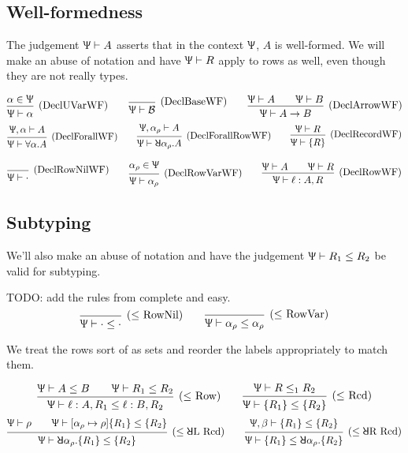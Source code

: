 \documentclass{article}
\newcommand{\declCtx}{\Uppsi}
\newcommand{\rcd}[1]{\{#1\}}
\newcommand{\B}{\mathcal{B}}
\newcommand{\rowall}{\rotatebox[origin=c]{180}{\(\mathsf{R}\)}}
\newcommand{\rowvar}{\alpha_\rho}
\newcommand{\spc}{\qquad}
\newcommand{\wf}[2]{#1 \vdash #2}
\newcommand{\subtype}{\le}
\newcommand{\subtypes}[3]{#1 \vdash #2 \le #3}
\newcommand{\deduct}[3][]
{
  \begin{prooftree}
    \hypo{#2}
    \infer1[\text{#1}]{#3}
  \end{prooftree}
}
\begin{document}
\subsection{Well-formedness}

The judgement \(\wf \declCtx A\) asserts that in the context \(\declCtx\), \(A\) is
well-formed. We will make an abuse of notation and have \(\wf \declCtx R\) apply to
rows as well, even though they are not really types.

\[
  \deduct[(DeclUVarWF)]
  {\alpha \in \declCtx}
  {\wf{\declCtx}{\alpha}}
  \spc
  \deduct[(DeclBaseWF)]
  {}
  {\wf{\declCtx}{\B}}
  \spc
  \deduct[(DeclArrowWF)]
  {\wf \declCtx A \spc \wf \declCtx B}
  {\wf \declCtx {A \to B}}
\]
\[
  \deduct[(DeclForallWF)]
  {\wf{\declCtx, \alpha}{A}}
  {\wf \declCtx {\forall \alpha. A}}
  \spc
  \deduct[(DeclForallRowWF)]
  {\wf{\declCtx, \rowvar}{A}}
  {\wf \declCtx {\rowall \rowvar. A}}
  \spc
  \deduct[(DeclRecordWF)]
  {\wf \declCtx R}
  {\wf \declCtx {\rcd{R}}}
\]

\[
  \deduct[(DeclRowNilWF)]
  {}
  {\wf \declCtx \cdot}
  \spc
  \deduct[(DeclRowVarWF)]
  {\rowvar \in \declCtx}
  {\wf \declCtx \rowvar}
  \spc
  \deduct[(DeclRowWF)]
  {\wf \declCtx A \spc \wf \declCtx R}
  {\wf \declCtx {\ell : A, R}}
\]


\subsection{Subtyping}
We'll also make an abuse of notation and have the judgement \(\subtypes{\declCtx}{R_1}{R_2}\) be valid for subtyping.

TODO: add the rules from complete and easy.
\[
  \deduct[(\(\subtype\) RowNil)]
  {}
  {\subtypes{\declCtx}{\cdot}{\cdot}}
  \spc
  \deduct[(\(\subtype\) RowVar)]
  {}
  {\subtypes{\declCtx}{\rowvar}{\rowvar}}
\]

We treat the rows sort of as sets and reorder the labels appropriately to match
them.

\[
  \deduct[(\(\subtype\) Row)]
  {\subtypes{\declCtx}{A}{B} \spc \subtypes{\declCtx}{R_1}{R_2}}
  {\subtypes \declCtx {\ell : A, R_1}{\ell : B, R_2}}
  \spc
  \deduct[(\(\subtype\) \text{Rcd})]
  {\subtypes \declCtx R_1 R_2}
  {\subtypes {\declCtx} {\rcd{R_1}} {\rcd{R_2}}}
\]
\[
  \deduct[(\(\subtype\rowall\)L Rcd)]
  {\wf \declCtx \rho \spc \subtypes \declCtx {[\rowvar \mapsto \rho]\rcd{R_1}} {\rcd{R_2}} }
  {\wf \declCtx \rowall \rowvar. \rcd{R_1} \le \rcd{R_2}}
  \spc
  \deduct[(\(\subtype\rowall\)R Rcd)]
  {\subtypes {\declCtx,\beta} {\rcd{R_1}} {\rcd{R_2}} }
  {\subtypes \declCtx {\rcd{R_1}} {\rowall \rowvar. \rcd{R_2}} }
\]
\end{document}
